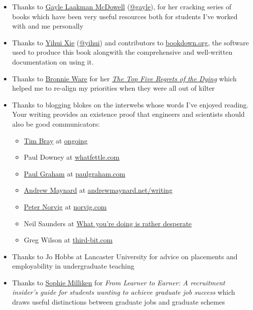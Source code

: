 \documentclass[
]{book}
\providecommand{\tightlist}{%
  \setlength{\itemsep}{0pt}\setlength{\parskip}{0pt}}
\begin{document}
\begin{itemize}
\tightlist
\item
  Thanks to \href{https://en.wikipedia.org/wiki/Gayle_Laakmann_McDowell}{Gayle Laakman McDowell} (\href{https://twitter.com/gayle}{@gayle}), for her cracking series of books \citep{techcareer, cracking, crackingpm, crackingthepmcareer} which have been very useful resources both for students I've worked with and me personally
\item
  Thanks to \href{https://en.wikipedia.org/wiki/Yihui_Xie}{Yihui Xie} (\href{https://github.com/yihui}{@yihui}) and contributors to \href{https://bookdown.org}{bookdown.org}, the software used to produce this book alongwith the comprehensive and well-written documentation on using it. \citep{xie2017, xie2015, xie2020}
\item
  Thanks to \href{https://en.wikipedia.org/wiki/Bronnie_Ware}{Bronnie Ware} for her \emph{\href{https://en.wikipedia.org/wiki/The_Top_Five_Regrets_of_the_Dying}{The Top Five Regrets of the Dying}} \citep{regrets} which helped me to re-align my priorities when they were all out of kilter
\item
  Thanks to blogging blokes on the interwebs whose words I've enjoyed reading. Your writing provides an existence proof that engineers and scientists should also be good communicators:

  \begin{itemize}
  \tightlist
  \item
    \href{https://en.wikipedia.org/wiki/Tim_Bray}{Tim Bray} at \href{https://www.tbray.org/ongoing/}{ongoing}
  \item
    Paul Downey at \href{https://blog.whatfettle.com/}{whatfettle.com}
  \item
    \href{https://en.wikipedia.org/wiki/Paul_Graham_(programmer)}{Paul Graham} at \href{http://paulgraham.com/}{paulgraham.com}
  \item
    \href{https://en.wikipedia.org/wiki/Andrew_D._Maynard}{Andrew Maynard} at \href{https://andrewmaynard.net/writing/}{andrewmaynard.net/writing}
  \item
    \href{https://en.wikipedia.org/wiki/Peter_Norvig}{Peter Norvig} at \href{https://norvig.com/}{norvig.com}
  \item
    Neil Saunders at \href{https://nsaunders.wordpress.com/blog/}{What you're doing is rather desperate}
  \item
    Greg Wilson at \href{https://third-bit.com/}{third-bit.com}
  \end{itemize}
\item
  Thanks to Jo Hobbs at Lancaster University for advice on placements and employability in undergraduate teaching
\item
  Thanks to \href{https://twitter.com/SRS_Sophie}{Sophie Milliken} for \emph{From Learner to Earner: A recruitment insider's guide for students wanting to achieve graduate job success} \citep{milliken} which draws useful distinctions between graduate jobs and graduate schemes
\end{itemize}
\end{document}
